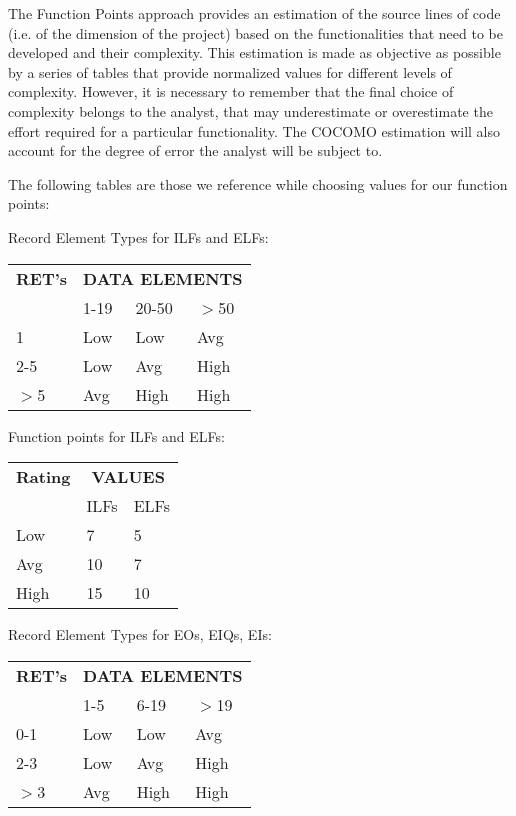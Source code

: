 \label{sec:FP}
The Function Points approach provides an estimation of the source lines of code (i.e. of the dimension of the project) based on the functionalities that need to be developed and their complexity. This estimation is made as objective as possible by a series of tables that provide normalized values for different levels of complexity. However, it is necessary to remember that the final choice of complexity belongs to the analyst, that may underestimate or overestimate the effort required for a particular functionality. The COCOMO estimation will also account for the degree of error the analyst will be subject to. 

The following tables are those we reference while choosing values for our function points:\\

	\begin{center}
		Record Element Types for ILFs and ELFs:
		
		\begin{tabular}{|l|l|l|l|}
			\hline
			\textbf{RET's} & \multicolumn{3}{|c|}{\textbf{DATA ELEMENTS}} \\ \cline{2-4}
			 & 1-19 & 20-50 & $>$50\\ \hline
			 1 & Low & Low & Avg\\ \hline
			 2-5 & Low & Avg & High\\ \hline
			 $>$5 & Avg & High & High\\ \hline
		\end{tabular}
		
		\vspace{1cm}
		
		Function points for ILFs and ELFs:
		
		\begin{tabular}{|l|l|l|}
			\hline
			\textbf{Rating} & \multicolumn{2}{|c|}{\textbf{VALUES}} \\ \cline{2-3}
			 & ILFs & ELFs\\ \hline
			 Low & 7 & 5\\ \hline
			 Avg & 10 & 7\\ \hline
			 High & 15 & 10\\ \hline
		\end{tabular}
		
		\vspace{1cm}
		
		Record Element Types for EOs, EIQs, EIs:
		
		\begin{tabular}{|l|l|l|l|}
			\hline
			\textbf{RET's} & \multicolumn{3}{|c|}{\textbf{DATA ELEMENTS}} \\ \cline{2-4}
			 & 1-5 & 6-19 & $>$19\\ \hline
			 0-1 & Low & Low & Avg\\ \hline
			 2-3 & Low & Avg & High\\ \hline
			 $>$3 & Avg & High & High\\ \hline
		\end{tabular}
		

\end{center}
